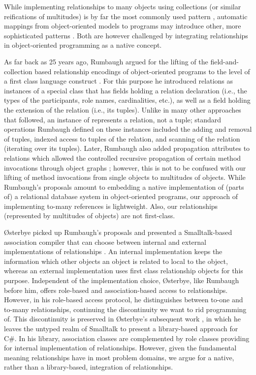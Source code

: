 {While implementing relationships to many objects using collections (or
similar reifications of multitudes) is by far the most commonly used pattern
\cite{ref26}, automatic mappings from object-oriented models to programs may
introduce other, more sophisticated patterns \cite{ref18}. Both are however
challenged by integrating relationships in object-oriented programming as a
native concept.

As far back as 25 years ago, Rumbaugh argued for the lifting of the
field-and-collection based relationship encodings of object-oriented
programs to the level of a first class language construct \cite{ref34}. For this
purpose he introduced relations as instances of a special class
 that has fields holding a relation declaration (i.e., the
types of the participants, role names, cardinalities, etc.), as well as a
field holding the extension of the relation (i.e., its tuples). Unlike in
many other approaches that followed, an instance of 
represents a relation, not a tuple; standard operations Rumbaugh defined on
these instances included the adding and removal of tuples, indexed access to
tuples of the relation, and scanning of the relation (iterating over its
tuples). Later, Rumbaugh also added propagation attributes to relations
which allowed the controlled recursive propagation of certain method
invocations through object graphs \cite{ref35}; however, this is not to be confused
with our lifting of method invocations from single objects to multitudes of
objects. While Rumbaugh's proposals amount to embedding a native
implementation of (parts of) a relational database system in
object-oriented programs, our approach of implementing to-many references is
lightweight. Also, our relationships (represented by multitudes of objects)
are not first-class.

\O{}sterbye picked up Rumbaugh's proposals and presented a Smalltalk-based
association compiler that can choose between internal and external
implementations of relationships \cite{ref32}. An internal implementation keeps the
information which other objects an object is related to local to the object,
whereas an external implementation uses first class relationship objects for
this purpose. Independent of the implementation choice, \O{}sterbye, like
Rumbaugh before him, offers role-based and association-based access to
relationships. However, in his role-based access protocol, he distinguishes
between to-one and to-many relationships, continuing the discontinuity we
want to rid programming of. This discontinuity is preserved in \O{}sterbye's
subsequent work \cite{ref31}, in which he leaves the untyped realm of Smalltalk
to present a library-based approach for C\#. In his library, association
classes are complemented by role classes providing for internal
implementation of relationships. However, given the fundamental meaning
relationships have in most problem domains, we argue for a native, rather
than a library-based, integration of relationships.

}
